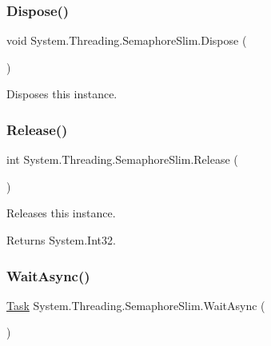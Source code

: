 \subsubsection{\texorpdfstring{Dispose()}{Dispose()}}
{\footnotesize\ttfamily void System.\+Threading.\+Semaphore\+Slim.\+Dispose (\begin{DoxyParamCaption}{ }\end{DoxyParamCaption})\hspace{0.3cm}{\ttfamily [inline]}}



Disposes this instance. 

\mbox{\label{class_system_1_1_threading_1_1_semaphore_slim_a0d5381112bb1ee977c693f4730d38f03}} 
\subsubsection{\texorpdfstring{Release()}{Release()}}
{\footnotesize\ttfamily int System.\+Threading.\+Semaphore\+Slim.\+Release (\begin{DoxyParamCaption}{ }\end{DoxyParamCaption})\hspace{0.3cm}{\ttfamily [inline]}}



Releases this instance. 

\begin{DoxyReturn}{Returns}
System.\+Int32.
\end{DoxyReturn}
\mbox{\label{class_system_1_1_threading_1_1_semaphore_slim_a65e8b6755086cbcb88fcdc5758a33a55}} 
\subsubsection{\texorpdfstring{Wait\+Async()}{WaitAsync()}\hspace{0.1cm}{\footnotesize\ttfamily [1/2]}}
{\footnotesize\ttfamily \hyperlink{class_system_1_1_threading_1_1_tasks_1_1_task}{Task} System.\+Threading.\+Semaphore\+Slim.\+Wait\+Async (\begin{DoxyParamCaption}{ }\end{DoxyParamCaption})}



